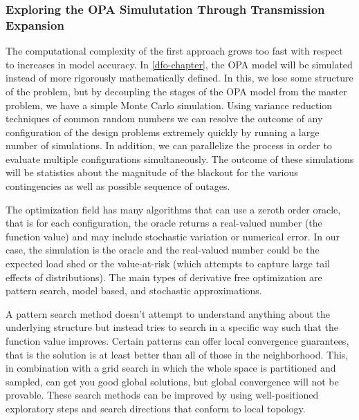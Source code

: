 \subsubsection{Exploring the OPA Simulutation Through Transmission Expansion}
The computational complexity of the first approach grows too fast with respect to increases in model accuracy.  In \cref{dfo-chapter}, the OPA model will be simulated instead of more rigorously mathematically defined.  In this, we lose some structure of the problem, but by decoupling the stages of the OPA model from the master problem, we have a simple Monte Carlo simulation.  Using variance reduction techniques of common random numbers we can resolve the outcome of any configuration of the design problems extremely quickly by running a large number of simulations.  In addition, we can parallelize the process in order to evaluate multiple configurations simultaneously.  The outcome of these simulations will be statistics about the magnitude of the blackout for the various contingencies as well as possible sequence of outages.

The optimization field has many algorithms that can use a zeroth order oracle, that is for each configuration, the oracle returns a real-valued number (the function value) and may include stochastic variation or numerical error.  In our case, the simulation is the oracle and the real-valued number could be the expected load shed or the value-at-risk (which attempts to capture large tail effects of distributions).  The main types of derivative free optimization are pattern search, model based, and stochastic approximations.  

A pattern search method doesn't attempt to understand anything about the underlying structure but instead tries to search in a specific way such that the function value improves.  Certain patterns can offer local convergence guarantees, that is the solution is at least better than all of those in the neighborhood.  This, in combination with a grid search in which the whole space is partitioned and sampled, can get you good global solutions, but global convergence will not be provable.  These search methods can be improved by using well-positioned exploratory steps and search directions that conform to local topology.


